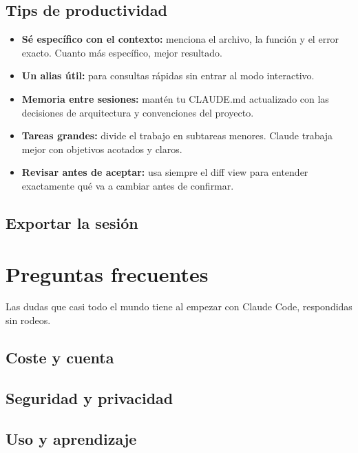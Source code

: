 \documentclass[11pt,a4paper]{report}
\DeclareRobustCommand{\texttt}[1]{{\ttfamily\seqsplit{#1}}}
\begin{document}
\section{Tips de productividad}

\begin{itemize}
\item \textbf{Sé específico con el contexto:} menciona el archivo, la función y el error exacto. Cuanto más específico, mejor resultado.
\item \textbf{Un alias útil:} \texttt{alias ai="claude -p"}para consultas rápidas sin entrar al modo interactivo.
\item \textbf{Memoria entre sesiones:} mantén tu CLAUDE.md actualizado con las decisiones de arquitectura y convenciones del proyecto.
\item \textbf{Tareas grandes:} divide el trabajo en subtareas menores. Claude trabaja mejor con objetivos acotados y claros.
\item \textbf{Revisar antes de aceptar:} usa siempre el diff view para entender exactamente qué va a cambiar antes de confirmar.
\end{itemize}

\section{Exportar la sesión}



\chapter{Preguntas frecuentes}

Las dudas que casi todo el mundo tiene al empezar con Claude Code, respondidas sin rodeos.

\section{ Coste y cuenta}

\section{ Seguridad y privacidad}

\section{ Uso y aprendizaje}
\end{document}
